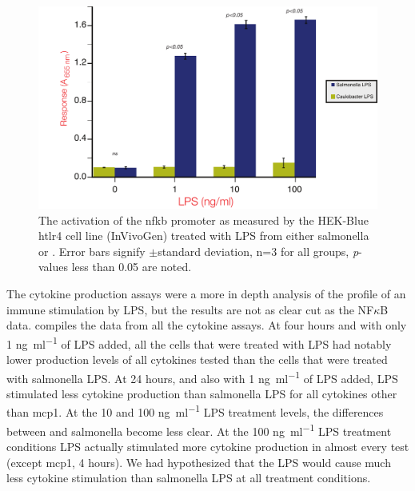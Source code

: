 \begin{figure}[htb]
  \begin{center}
    \includegraphics[width=\textwidth]{lps_chapter/img/NFkBAssay.pdf}
  \end{center}
  \caption[\ac{nfkb} Assay for cellular activation by \ac{LPS}]{
    The activation of the \ac{nfkb} promoter as measured by the HEK-Blue h\ac{tlr4}\texttrademark{} cell line (InVivoGen) treated with \ac{LPS} from either \ac{salmonella} or \caulobacter{}. Error bars signify $\pm{}$standard deviation, n=3 for all groups, \textit{p}-values less than 0.05 are noted.  }
  \label{fig:nfkbassay}
\end{figure}    

The cytokine production assays were a more in depth analysis of the profile of an immune stimulation by \caulobacter{} \ac{LPS}, but the results are not as clear cut as the NF$\kappa$B data.  compiles the data from all the cytokine assays. At four hours and with only 1 \si{\nano\gram\per\milli\litre} of \ac{LPS} added, all the cells that were treated with \caulobacter{} \ac{LPS} had notably lower production levels of all cytokines tested than the cells that were treated with \ac{salmonella} \ac{LPS}. At 24 hours, and also with 1 \si{\nano\gram\per\milli\litre} of \ac{LPS} added, \caulobacter{} \ac{LPS} stimulated less cytokine production than \ac{salmonella} \ac{LPS} for all cytokines other than \ac{mcp1}. At the 10 and 100 \si{\nano\gram\per\milli\litre} \ac{LPS} treatment levels, the differences between \caulobacter{} and \ac{salmonella} become less clear. At the 100 \si{\nano\gram\per\milli\litre} \ac{LPS} treatment conditions \caulobacter{} \ac{LPS} actually stimulated more cytokine production in almost every test (except \ac{mcp1}, 4 hours). We had hypothesized that the \caulobacter{}  \ac{LPS} would cause much less cytokine stimulation than \ac{salmonella} \ac{LPS} at all treatment conditions. 

